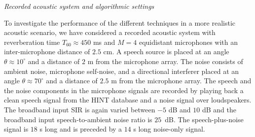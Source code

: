\documentclass[10pt]{IEEEtran}
\begin{document}
\vskip 5pt
{{
\textit{Recorded acoustic system and algorithmic settings}

\vskip 5pt

To investigate the performance of the different techniques in a more realistic acoustic scenario, we have considered a recorded acoustic system with reverberation time $T_{60} \approx 450$ ms and $M = 4$ equidistant microphones with an inter-microphone distance of $2.5$ cm. 
A speech source is placed at an angle $\theta \approx 10^\circ$ and a distance of $2$ m from the microphone array.
The noise consists of ambient noise, microphone self-noise, and a directional interferer placed at an angle $\theta \approx 70^\circ$ and a distance of $2.5$ m from the microphone array.
The speech and the noise components in the microphone signals are recorded by playing back a clean speech signal from the HINT database and a noise signal over loudspeakers.
The broadband input SIR is again varied between $-5$ dB and $10$ dB and the broadband input speech-to-ambient noise ratio is $25$~dB.
The speech-plus-noise signal is $18$ s long and is preceded by a $14$ s long noise-only signal.


}}
\end{document}
